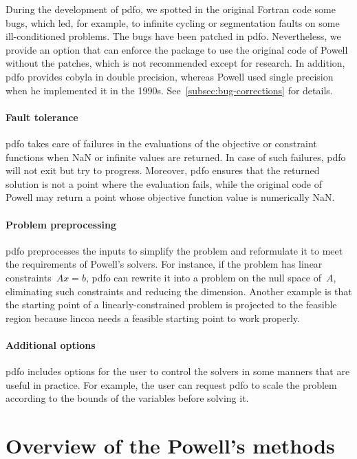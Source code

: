 During the development of \gls{pdfo}, we spotted in the original Fortran code some bugs, which led, for example, to infinite cycling or segmentation faults on some ill-conditioned problems.
The bugs have been patched in \gls{pdfo}.
Nevertheless, we provide an option that can enforce the package to use the original code of Powell without the patches, which is not recommended except for research.
In addition, \gls{pdfo} provides \gls{cobyla} in double precision, whereas Powell used single precision when he implemented it in the 1990s.
See~\cref{subsec:bug-corrections} for details.

\paragraph{Fault tolerance}

\Gls{pdfo} takes care of failures in the evaluations of the objective or constraint functions when NaN or infinite values are returned.
In case of such failures, \gls{pdfo} will not exit but try to progress.
Moreover, \gls{pdfo} ensures that the returned solution is not a point where the evaluation fails, while the original code of Powell may return a point whose objective function value is numerically NaN.

\paragraph{Problem preprocessing}

\gls{pdfo} preprocesses the inputs to simplify the problem and reformulate it to meet the requirements of Powell's solvers.
For instance, if the problem has linear constraints~$A x = b$, \gls{pdfo} can rewrite it into a problem on the null space of~$A$, eliminating such constraints and reducing the dimension.
Another example is that the starting point of a linearly-constrained problem is projected to the feasible region because \gls{lincoa} needs a feasible starting point to work properly.

\paragraph{Additional options}

\gls{pdfo} includes options for the user to control the solvers in some manners that are useful in practice.
For example, the user can request \gls{pdfo} to scale the problem according to the bounds of the variables before solving it.

\section{Overview of the Powell's  methods}
\label{sec:powell}

